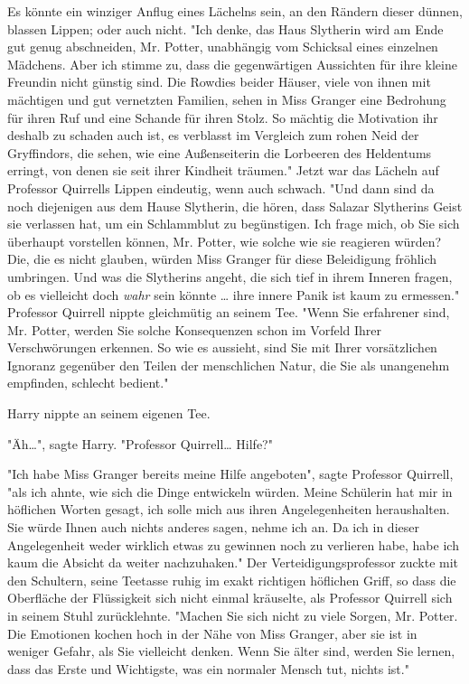 {Es könnte ein winziger Anflug eines Lächelns sein, an den Rändern dieser dünnen, blassen Lippen; oder auch nicht. "Ich denke, das Haus Slytherin wird am Ende gut genug abschneiden, Mr. Potter, unabhängig vom Schicksal eines einzelnen Mädchens. Aber ich stimme zu, dass die gegenwärtigen Aussichten für ihre kleine Freundin nicht günstig sind. Die Rowdies beider Häuser, viele von ihnen mit mächtigen und gut vernetzten Familien, sehen in Miss Granger eine Bedrohung für ihren Ruf und eine Schande für ihren Stolz. So mächtig die Motivation ihr deshalb zu schaden auch ist, es verblasst im Vergleich zum rohen Neid der Gryffindors, die sehen, wie eine Außenseiterin die Lorbeeren des Heldentums erringt, von denen sie seit ihrer Kindheit träumen." Jetzt war das Lächeln auf Professor Quirrells Lippen eindeutig, wenn auch schwach. "Und dann sind da noch diejenigen aus dem Hause Slytherin, die hören, dass Salazar Slytherins Geist sie verlassen hat, um ein Schlammblut zu begünstigen. Ich frage mich, ob Sie sich überhaupt vorstellen können, Mr. Potter, wie solche wie sie reagieren würden? Die, die es nicht glauben, würden Miss Granger für diese Beleidigung fröhlich umbringen. Und was die Slytherins angeht, die sich tief in ihrem Inneren fragen, ob es vielleicht doch \emph{wahr} sein könnte … ihre innere Panik ist kaum zu ermessen." Professor Quirrell nippte gleichmütig an seinem Tee. "Wenn Sie erfahrener sind, Mr. Potter, werden Sie solche Konsequenzen schon im Vorfeld Ihrer Verschwörungen erkennen. So wie es aussieht, sind Sie mit Ihrer vorsätzlichen Ignoranz gegenüber den Teilen der menschlichen Natur, die Sie als unangenehm empfinden, schlecht bedient."

Harry nippte an seinem eigenen Tee.

"Äh…", sagte Harry. "Professor Quirrell… Hilfe?"

"Ich habe Miss Granger bereits meine Hilfe angeboten", sagte Professor Quirrell, "als ich ahnte, wie sich die Dinge entwickeln würden. Meine Schülerin hat mir in höflichen Worten gesagt, ich solle mich aus ihren Angelegenheiten heraushalten. Sie würde Ihnen auch nichts anderes sagen, nehme ich an. Da ich in dieser Angelegenheit weder wirklich etwas zu gewinnen noch zu verlieren habe, habe ich kaum die Absicht da weiter nachzuhaken." Der Verteidigungsprofessor zuckte mit den Schultern, seine Teetasse ruhig im exakt richtigen höflichen Griff, so dass die Oberfläche der Flüssigkeit sich nicht einmal kräuselte, als Professor Quirrell sich in seinem Stuhl zurücklehnte. "Machen Sie sich nicht zu viele Sorgen, Mr. Potter. Die Emotionen kochen hoch in der Nähe von Miss Granger, aber sie ist in weniger Gefahr, als Sie vielleicht denken. Wenn Sie älter sind, werden Sie lernen, dass das Erste und Wichtigste, was ein normaler Mensch tut, nichts ist."

}
